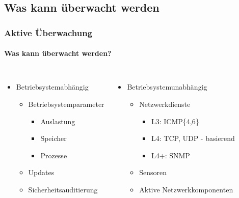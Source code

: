 \documentclass[10pt]{beamer} %
\begin{document}
\subsection{Was kann überwacht werden}
\begin{frame}
\frametitle{Aktive Überwachung}
\framesubtitle{Was kann überwacht werden?}

    \begin{alertblock}{}
    \end{alertblock}

    \vspace{0.5cm}

    \begin{columns}
            \begin{itemize}
                \item Betriebsystem\color{red}abhängig
                    \begin{itemize}
                        \item Betriebsystemparameter
                        \begin{itemize}
                            \item   Auslastung
                            \item   Speicher
                            \item   Prozesse
                        \end{itemize}
                        \item Updates
                        \item Sicherheitsauditierung
                    \end{itemize}
             \end{itemize}
    
        \begin{itemize}
            \item Betriebsystem\color{red}unabhängig
            \begin{itemize}
                \item Netzwerkdienste
                \begin{itemize}
                    \item L3:   ICMP\{4,6\}
                    \item L4:   TCP, UDP - basierend
                    \item L4+:  SNMP
                \end{itemize}
                \item Sensoren
                \item Aktive Netzwerkkomponenten
            \end{itemize}
        \end{itemize} 
    \end{columns}




\end{frame}
\end{document}
